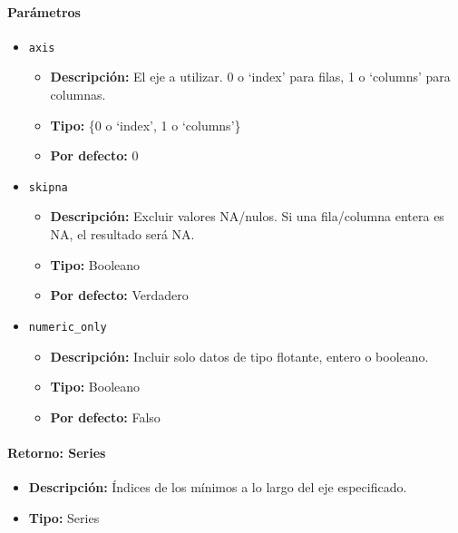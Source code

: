         \paragraph{\textbf{Parámetros}}
        \begin{itemize}
            \item \texttt{axis}
                \begin{itemize}
                    \item \textbf{Descripción:} El eje a utilizar. 0 o `index' para filas, 1 o `columns' para columnas.
                    \item \textbf{Tipo:} \{0 o `index', 1 o `columns'\}
                    \item \textbf{Por defecto:} 0
                \end{itemize}
            \item \texttt{skipna}
                \begin{itemize}
                    \item \textbf{Descripción:} Excluir valores NA/nulos. Si una fila/columna entera es NA, el resultado será NA.
                    \item \textbf{Tipo:} Booleano
                    \item \textbf{Por defecto:} Verdadero
                \end{itemize}
            \item \texttt{numeric\_only}
                \begin{itemize}
                    \item \textbf{Descripción:} Incluir solo datos de tipo flotante, entero o booleano.
                    \item \textbf{Tipo:} Booleano
                    \item \textbf{Por defecto:} Falso
                \end{itemize}
        \end{itemize}

        \paragraph{\textbf{Retorno:} Series}
        \begin{itemize}
            \item \textbf{Descripción:} Índices de los mínimos a lo largo del eje especificado.
            \item \textbf{Tipo:} Series
        \end{itemize}

